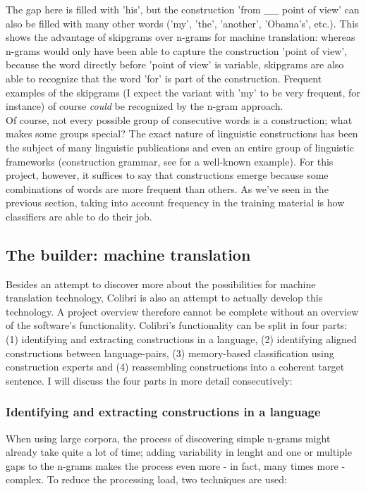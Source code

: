 \documentclass[12pt]{article}
\begin{document}
The gap here is filled with 'his', but the construction 'from \_\_ point of view' can also be filled with many other words ('my', 'the', 'another', 'Obama's', etc.). This shows the advantage of skipgrams over n-grams for machine translation: whereas n-grams would only have been able to capture the construction 'point of view', because the word directly before 'point of view' is variable, skipgrams are also able to recognize that the word 'for' is part of the construction. Frequent examples of the skipgrams (I expect the variant with 'my' to be very frequent, for instance) of course \emph{could} be recognized by the n-gram approach.\\\indent
Of course, not every possible group of consecutive words is a construction; what makes some groups special? The exact nature of linguistic constructions has been the subject of many linguistic publications and even an entire group of linguistic frameworks (construction grammar, see \citet{goldberg95} for a well-known example). For this project, however, it suffices to say that constructions emerge because some combinations of words are more frequent than others. As we've seen in the previous section, taking into account frequency in the training material is how classifiers are able to do their job.

\subsection{The builder: machine translation} \label{builder}
Besides an attempt to discover more about the possibilities for machine translation technology, Colibri is also an attempt to actually develop this technology. A project overview therefore cannot be complete without an overview of the software's functionality. Colibri's functionality can be split in four parts: (1) identifying and extracting constructions in a language, (2) identifying aligned constructions between language-pairs, (3) memory-based classification using construction experts and (4) reassembling constructions into a coherent target sentence. I will discuss the four parts in more detail consecutively:

\subsubsection{Identifying and extracting constructions in a language}
When using large corpora, the process of discovering simple n-grams might already take quite a lot of time; adding variability in lenght and one or multiple gaps to the n-grams makes the process even more - in fact, many times more - complex. To reduce the processing load, two techniques are used:
\end{document}
